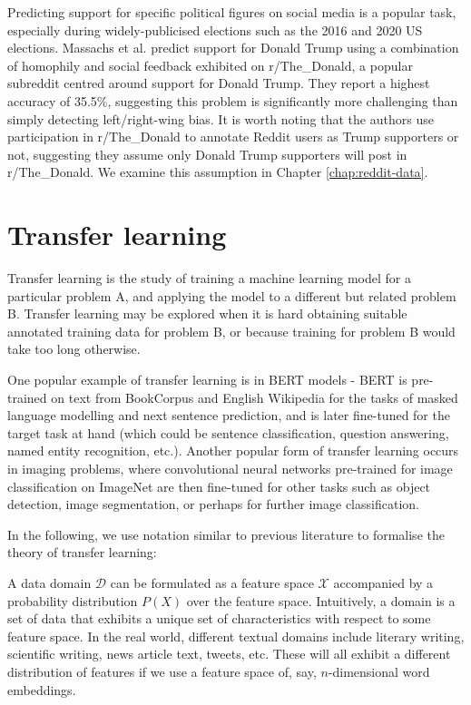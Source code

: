 Predicting support for specific political figures on social media is a popular task, especially during widely-publicised elections such as the 2016 and 2020 US elections. Massachs et al. \cite{massachs} predict support for Donald Trump using a combination of homophily and social feedback exhibited on r/The\_Donald, a popular subreddit centred around support for Donald Trump. They report a highest accuracy of 35.5\%, suggesting this problem is significantly more challenging than simply detecting left/right-wing bias. It is worth noting that the authors use participation in r/The\_Donald to annotate Reddit users as Trump supporters or not, suggesting they assume only Donald Trump supporters will post in r/The\_Donald. We examine this assumption in Chapter \ref{chap:reddit-data}.

\section{Transfer learning} \label{sec:transfer-learning}

Transfer learning is the study of training a machine learning model for a particular problem A, and applying the model to a different but related problem B. Transfer learning may be explored when it is hard obtaining suitable annotated training data for problem B, or because training for problem B would take too long otherwise.

One popular example of transfer learning is in BERT models - BERT is pre-trained on text from BookCorpus and English Wikipedia \cite{bert} for the tasks of masked language modelling and next sentence prediction, and is later fine-tuned for the target task at hand (which could be sentence classification, question answering, named entity recognition, etc.). Another popular form of transfer learning occurs in imaging problems, where convolutional neural networks pre-trained for image classification on ImageNet are then fine-tuned for other tasks such as object detection, image segmentation, or perhaps for further image classification.

In the following, we use notation similar to previous literature \cite{ruder} \cite{pan-survey} to formalise the theory of transfer learning:

A data domain $ \mathcal{D} $ can be formulated as a feature space $ \mathcal{X} $ accompanied by a probability distribution $ P(X) $ over the feature space. Intuitively, a domain is a set of data that exhibits a unique set of characteristics with respect to some feature space. In the real world, different textual domains include literary writing, scientific writing, news article text, tweets, etc. These will all exhibit a different distribution of features if we use a feature space of, say, $n$-dimensional word embeddings.

